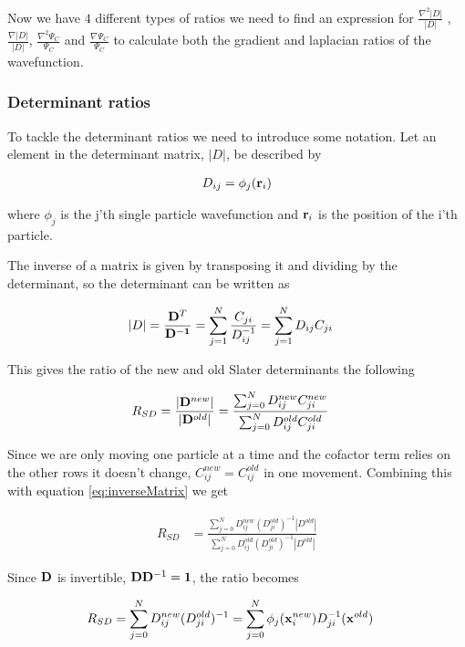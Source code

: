 \documentclass[11pt]{article}
\begin{document}
		Now we have \(4\) different types of ratios we need to find an expression for \( \frac{\nabla^2 |D|}{|D|} \) , \(\frac{\nabla |D|}{|D|} \), \( \frac{\nabla^2\Psi_C}{\Psi_C} \) and \( \frac{\nabla\Psi_C}{\Psi_C} \) to calculate both the gradient and laplacian ratios of the wavefunction.

		\subsubsection{Determinant ratios}
		To tackle the determinant ratios we need to introduce some notation. Let an element in the determinant matrix, \(|D|\),  be described by

		\begin{align}
			D_{ij} = \phi_j(\vb{r}_i)
		\end{align}

		where \(\phi_j\) is the j'th single particle wavefunction and \( \vb{r}_i \) is the position of the i'th particle. 

		The inverse of a matrix is given by transposing it and dividing by the determinant, so the determinant can be written as

		\begin{align}
			|D| &= \frac{\vb{D}^T}{\vb{D^{-1}}} = \sum_{j=1}^{N}{\frac{C_{ji}  }{ D^{-1}_{ij} } } = \sum_{j=1}^{N}{ D_{ij}C_{ji} }
			\label{eq:inverseMatrix}
		\end{align}

		This gives the ratio of the new and old Slater determinants the following

		\begin{align}
			R_{SD} &= \frac{|\vb{D}^{new}|}{|\vb{D}^{old}|} = \frac{\sum_{j=0}^N D_{ij}^{new} C_{ji}^{new} }{\sum_{j=0}^N D_{ij}^{old} C_{ji}^{old} }
		\end{align}

		Since we are only moving one particle at a time and the cofactor term relies on the other rows it doesn't change, \(C^{new}_{ij} = C^{old}_{ij}\) in one movement. Combining this with equation \eqref{eq:inverseMatrix} we get

		\begin{align}
			R_{SD} &=  \frac{\sum_{j=0}^N D_{ij}^{new} (D_{ji}^{old})^{-1} |D^{old}| }{\sum_{j=0}^N D_{ij}^{old} (D_{ji}^{old})^{-1} |D^{old}| }
		\end{align}

		Since \(\vb{D}\) is invertible, \(\vb{D}\vb{D}^{-1} = \vb{1}\), the ratio becomes

		\begin{align}
			R_{SD} &= \sum_{j = 0}^{N}D_{ij}^{new}(D_{ji}^{old})^{-1} = \sum_{j = 0}^{N} \phi_j(\vb{x}^{new}_i) D_{ji}^{-1}(\vb{x}^{old}) 
		\end{align} 
\end{document}
